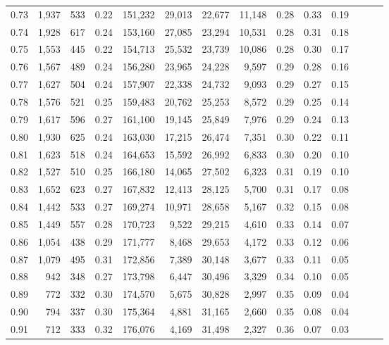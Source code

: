 \begin{tabular}{rrrrrrrrrrrrrr}
0.73 &  1,937 &  533 &  0.22 &  151,232 &   29,013 &  22,677 &  11,148 &  0.28 &  0.33 &      0.19 \\
0.74 &  1,928 &  617 &  0.24 &  153,160 &   27,085 &  23,294 &  10,531 &  0.28 &  0.31 &      0.18 \\
0.75 &  1,553 &  445 &  0.22 &  154,713 &   25,532 &  23,739 &  10,086 &  0.28 &  0.30 &      0.17 \\
0.76 &  1,567 &  489 &  0.24 &  156,280 &   23,965 &  24,228 &   9,597 &  0.29 &  0.28 &      0.16 \\
0.77 &  1,627 &  504 &  0.24 &  157,907 &   22,338 &  24,732 &   9,093 &  0.29 &  0.27 &      0.15 \\
0.78 &  1,576 &  521 &  0.25 &  159,483 &   20,762 &  25,253 &   8,572 &  0.29 &  0.25 &      0.14 \\
0.79 &  1,617 &  596 &  0.27 &  161,100 &   19,145 &  25,849 &   7,976 &  0.29 &  0.24 &      0.13 \\
0.80 &  1,930 &  625 &  0.24 &  163,030 &   17,215 &  26,474 &   7,351 &  0.30 &  0.22 &      0.11 \\
0.81 &  1,623 &  518 &  0.24 &  164,653 &   15,592 &  26,992 &   6,833 &  0.30 &  0.20 &      0.10 \\
0.82 &  1,527 &  510 &  0.25 &  166,180 &   14,065 &  27,502 &   6,323 &  0.31 &  0.19 &      0.10 \\
0.83 &  1,652 &  623 &  0.27 &  167,832 &   12,413 &  28,125 &   5,700 &  0.31 &  0.17 &      0.08 \\
0.84 &  1,442 &  533 &  0.27 &  169,274 &   10,971 &  28,658 &   5,167 &  0.32 &  0.15 &      0.08 \\
0.85 &  1,449 &  557 &  0.28 &  170,723 &    9,522 &  29,215 &   4,610 &  0.33 &  0.14 &      0.07 \\
0.86 &  1,054 &  438 &  0.29 &  171,777 &    8,468 &  29,653 &   4,172 &  0.33 &  0.12 &      0.06 \\
0.87 &  1,079 &  495 &  0.31 &  172,856 &    7,389 &  30,148 &   3,677 &  0.33 &  0.11 &      0.05 \\
0.88 &    942 &  348 &  0.27 &  173,798 &    6,447 &  30,496 &   3,329 &  0.34 &  0.10 &      0.05 \\
0.89 &    772 &  332 &  0.30 &  174,570 &    5,675 &  30,828 &   2,997 &  0.35 &  0.09 &      0.04 \\
0.90 &    794 &  337 &  0.30 &  175,364 &    4,881 &  31,165 &   2,660 &  0.35 &  0.08 &      0.04 \\
0.91 &    712 &  333 &  0.32 &  176,076 &    4,169 &  31,498 &   2,327 &  0.36 &  0.07 &      0.03 \\

\end{tabular}
